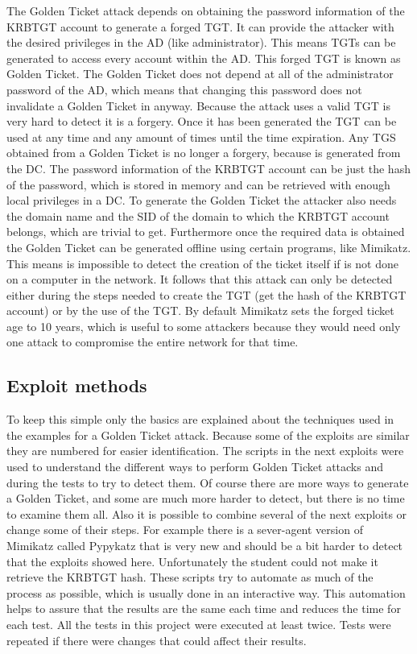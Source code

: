 \linej
The Golden Ticket attack depends on obtaining the password information of the KRBTGT account to generate a forged TGT. It can provide the attacker with the desired privileges in the AD (like administrator).
\linej
This means TGTs can be generated to access every account within the AD. This forged TGT is known as Golden Ticket.
The Golden Ticket does not depend at all of the administrator password of the AD, which means that changing this password does not invalidate a Golden Ticket in anyway.
\linej
\linej
Because the attack uses a valid TGT is very hard to detect it is a forgery. Once it has been generated the TGT can be used at any time and any amount of times until the time expiration.
Any TGS obtained from a Golden Ticket is no longer a forgery, because is generated from the DC.
\linej
\linej
The password information of the KRBTGT account can be just the hash of the password, which is stored in memory and can be retrieved with enough local privileges in a DC. To generate the Golden Ticket the attacker also needs the domain name and the SID of the domain to which the KRBTGT account belongs, which are trivial to get\cite{stealthbits}.
\linej
Furthermore once the required data is obtained the Golden Ticket can be generated offline using certain programs, like Mimikatz. This means is impossible to detect the creation of the ticket itself if is not done on a computer in the network.
\linej
It follows that this attack can only be detected either during the steps needed to create the TGT (get the hash of the KRBTGT account) or by the use of the TGT.
\linej
\linej
By default Mimikatz sets the forged ticket age to 10 years, which is useful to some attackers because they would need only one attack to compromise the entire network for that time.

\subsection{Exploit methods}
To keep this simple only the basics are explained about the techniques used in the examples for a Golden Ticket attack. Because some of the exploits are similar they are numbered for easier identification. The scripts in the next exploits were used to understand the different ways to perform Golden Ticket attacks and during the tests to try to detect them. Of course there are more ways to generate a Golden Ticket, and some are much more harder to detect, but there is no time to examine them all. Also it is possible to combine several of the next exploits or change some of their steps.
\linej
For example there is a sever-agent version of Mimikatz called Pypykatz\cite{pypykatz_agent}\cite{pypykatz_server} that is very new and should be a bit harder to detect that the exploits showed here. Unfortunately the student could not make it retrieve the KRBTGT hash.
\linej
\linej
These scripts try to automate as much of the process as possible, which is usually done in an interactive way. This automation helps to assure that the results are the same each time and reduces the time for each test. All the tests in this project were executed at least twice. Tests were repeated if there were changes that could affect their results.

